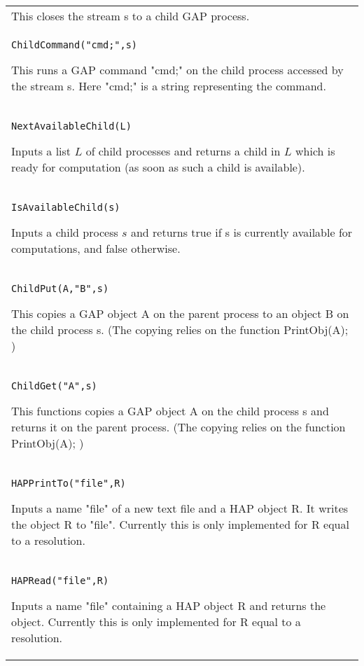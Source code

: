 \documentclass[a4paper,11pt]{report}
\begin{document}
{\begin{center}
\begin{tabular}{|l|}
 This closes the stream s to a child GAP process. \\
 \index{ChildCommand} \texttt{ChildCommand("cmd;",s)} 

 This runs a GAP command "cmd;" on the child process accessed by the stream s.
Here "cmd;" is a string representing the command. \\
 \index{NextAvailableChild} \texttt{NextAvailableChild(L)} 

 Inputs a list $L$ of child processes and returns a child in $L$ which is ready for computation (as soon as such a child is available). \\
 \index{IsAvailableChild} \texttt{IsAvailableChild(s)} 

 Inputs a child process $s$ and returns true if s is currently available for computations, and false
otherwise. \\
 \index{ChildPut} \texttt{ChildPut(A,"B",s)} 

 This copies a GAP object A on the parent process to an object B on the child
process s. (The copying relies on the function PrintObj(A); ) \\
 \index{ChildGet} \texttt{ChildGet("A",s)} 

 This functions copies a GAP object A on the child process s and returns it on
the parent process. (The copying relies on the function PrintObj(A); ) \\
 \index{HAPPrintTo} \texttt{HAPPrintTo("file",R)} 

 Inputs a name "file" of a new text file and a HAP object R. It writes the
object R to "file". Currently this is only implemented for R equal to a
resolution. \\
 \index{HAPRead} \texttt{HAPRead("file",R)} 

 Inputs a name "file" containing a HAP object R and returns the object.
Currently this is only implemented for R equal to a resolution. \\
\end{tabular}\\[2mm]
\end{center}

 }

 
\end{document}
